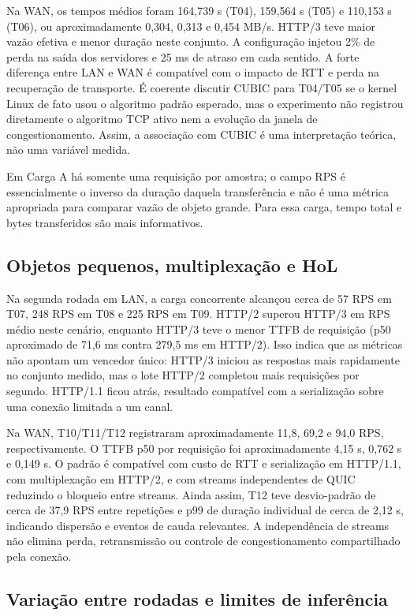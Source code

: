 \documentclass[12pt,a4paper]{article}
\begin{document}
Na WAN, os tempos médios foram 164,739 s (T04), 159,564 s (T05) e 110,153 s (T06), ou
aproximadamente 0,304, 0,313 e 0,454 MB/s. HTTP/3 teve maior vazão efetiva e menor duração
neste conjunto. A configuração injetou 2\% de perda na saída dos servidores e 25 ms de atraso
em cada sentido. A forte diferença entre LAN e WAN é compatível com o impacto de RTT e perda
na recuperação de transporte. É coerente discutir CUBIC para T04/T05 se o kernel Linux de fato
usou o algoritmo padrão esperado, mas o experimento não registrou diretamente o algoritmo
TCP ativo nem a evolução da janela de congestionamento. Assim, a associação com CUBIC é uma
interpretação teórica, não uma variável medida.

Em Carga A há somente uma requisição por amostra; o campo RPS é essencialmente o inverso
da duração daquela transferência e não é uma métrica apropriada para comparar vazão de
objeto grande. Para essa carga, tempo total e bytes transferidos são mais informativos.

\subsection{Objetos pequenos, multiplexação e HoL}

Na segunda rodada em LAN, a carga concorrente alcançou cerca de 57 RPS em T07, 248 RPS em
T08 e 225 RPS em T09. HTTP/2 superou HTTP/3 em RPS médio neste cenário, enquanto HTTP/3
teve o menor TTFB de requisição (p50 aproximado de 71,6 ms contra 279,5 ms em HTTP/2).
Isso indica que as métricas não apontam um vencedor único: HTTP/3 iniciou as respostas mais
rapidamente no conjunto medido, mas o lote HTTP/2 completou mais requisições por segundo.
HTTP/1.1 ficou atrás, resultado compatível com a serialização sobre uma conexão limitada a
um canal.

Na WAN, T10/T11/T12 registraram aproximadamente 11,8, 69,2 e 94,0 RPS, respectivamente.
O TTFB p50 por requisição foi aproximadamente 4,15 s, 0,762 s e 0,149 s. O padrão é
compatível com custo de RTT e serialização em HTTP/1.1, com multiplexação em HTTP/2, e com
streams independentes de QUIC reduzindo o bloqueio entre streams. Ainda assim, T12 teve
desvio-padrão de cerca de 37,9 RPS entre repetições e p99 de duração individual de cerca de
2,12 s, indicando dispersão e eventos de cauda relevantes. A independência de streams não
elimina perda, retransmissão ou controle de congestionamento compartilhado pela conexão.

\subsection{Variação entre rodadas e limites de inferência}
\end{document}
